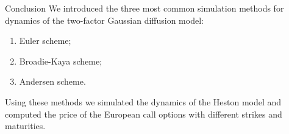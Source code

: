 \documentclass{vegapresentation}
\begin{document}
        \begin{frame}{Conclusion}
            We introduced the three most common simulation methods for dynamics of the two-factor Gaussian diffusion model:
            \begin{enumerate}
                \item Euler scheme; \\
                \item Broadie-Kaya scheme; \\
                \item Andersen scheme.
            \end{enumerate}
            Using these methods we simulated the dynamics of the Heston model and computed the price of the European call options with different strikes and maturities.
        \end{frame}
\end{document}
